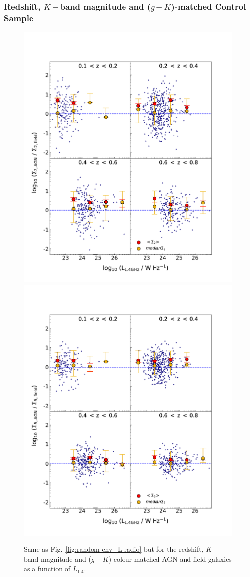 \subsubsection{Redshift, $K-$band magnitude and ($g-K$)-matched Control Sample}

\begin{figure}
\hspace*{-50pt}
  \includegraphics[width=0.6\columnwidth]{plots_chp2/env_L_radio_binned_errs_2_super_control.pdf}
  \includegraphics[width=0.6\columnwidth]{plots_chp2/env_L_radio_binned_errs_5_super_control.pdf}
  \caption[Sample (iii): Mean and median surface densities, $\Sigma_{2,\rm{R}}$ and $\Sigma_{5,\rm{R}},$ in $L_{1.4}$ bins.]{Same as Fig.~\ref{fig:random-env_L-radio} but for the redshift, $K-$band magnitude and ($g-K$)-colour matched AGN and field galaxies as a function of $L_{1.4}$. }
  \label{fig:supercontrol-env_L-radio}
\end{figure}

